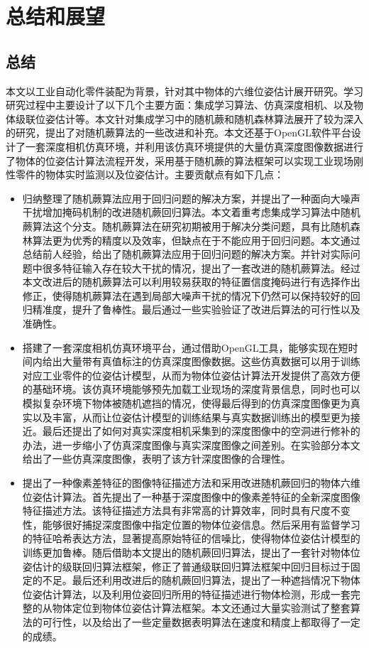 \chapter{总结和展望}
\section{总结}

本文以工业自动化零件装配为背景，针对其中物体的六维位姿估计展开研究。学习研究过程中主要设计了以下几个主要方面：集成学习算法、仿真深度相机、以及物体级联位姿估计等。本文针对集成学习中的随机蕨和随机森林算法展开了较为深入的研究，提出了对随机蕨算法的一些改进和补充。本文还基于OpenGL软件平台设计了一套深度相机仿真环境，并利用该仿真环境提供的大量仿真深度图像数据进行了物体的位姿估计算法流程开发，采用基于随机蕨的算法框架可以实现工业现场刚性零件的物体实时监测以及位姿估计。主要贡献点有如下几点：

\begin{itemize}
\item 归纳整理了随机蕨算法应用于回归问题的解决方案，并提出了一种面向大噪声干扰增加掩码机制的改进随机蕨回归算法。本文着重考虑集成学习算法中随机蕨算法这个分支。随机蕨算法在研究初期被用于解决分类问题，具有比随机森林算法更为优秀的精度以及效率，但缺点在于不能应用于回归问题。本文通过总结前人经验，给出了随机蕨算法应用于回归问题的解决方案。并针对实际问题中很多特征输入存在较大干扰的情况，提出了一套改进的随机蕨算法。经过本文改进后的随机蕨算法可以利用较易获取的特征置信度掩码进行有选择作出修正，使得随机蕨算法在遇到局部大噪声干扰的情况下仍然可以保持较好的回归精准度，提升了鲁棒性。最后通过一些实验验证了改进后算法的可行性以及准确性。

\item 搭建了一套深度相机仿真环境平台，通过借助OpenGL工具，能够实现在短时间内给出大量带有真值标注的仿真深度图像数据。这些仿真数据可以用于训练对应工业零件的位姿估计模型，从而为物体位姿估计算法开发提供了高效方便的基础环境。该仿真环境能够预先加载工业现场的深度背景信息，同时也可以模拟复杂环境下物体被随机遮挡的情况，使得最后得到的仿真深度图像更为真实以及丰富，从而让位姿估计模型的训练结果与真实数据训练出的模型更为接近。最后还提出了如何对真实深度相机采集到的深度图像中的空洞进行修补的办法，进一步缩小了仿真深度图像与真实深度图像之间差别。在实验部分本文给出了一些仿真深度图像，表明了该方针深度图像的合理性。

\item 提出了一种像素差特征的图像特征描述方法和采用改进随机蕨回归的物体六维位姿估计算法。首先提出了一种基于深度图像中的像素差特征的全新深度图像特征描述方法。该特征描述方法具有非常高的计算效率，同时具有尺度不变性，能够很好捕捉深度图像中指定位置的物体位姿信息。然后采用有监督学习的特征哈希表达方法，显著提高原始特征的信噪比，使得物体位姿估计模型的训练更加鲁棒。随后借助本文提出的随机蕨回归算法，提出了一套针对物体位姿估计的级联回归算法框架，修正了普通级联回归算法框架中回归目标过于固定的不足。最后还利用改进后的随机蕨回归算法，提出了一种遮挡情况下物体位姿估计算法，以及利用位姿回归所用的特征描述进行物体检测，形成一套完整的从物体定位到物体位姿估计算法框架。本文还通过大量实验测试了整套算法的可行性，以及给出了一些定量数据表明算法在速度和精度上都取得了一定的成绩。
\end{itemize}


